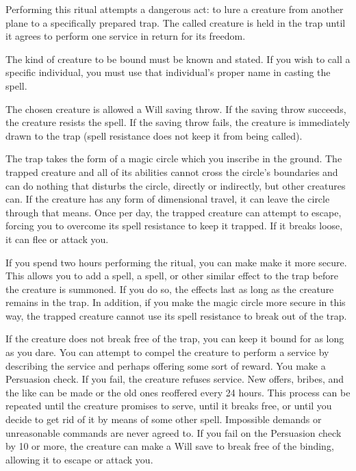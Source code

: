 \spelleffect Performing this ritual attempts a dangerous act: to lure a creature from another plane to a specifically prepared trap. The called creature is held in the trap until it agrees to perform one service in return for its freedom.
\par The kind of creature to be bound must be known and stated. If you wish to call a specific individual, you must use that individual's proper name in casting the spell.
\par The chosen creature is allowed a Will saving throw. If the saving throw succeeds, the creature resists the spell. If the saving throw fails, the creature is immediately drawn to the trap (spell resistance does not keep it from being called).
\par The trap takes the form of a magic circle which you inscribe in the ground. The trapped creature and all of its abilities cannot cross the circle's boundaries and can do nothing that disturbs the circle, directly or indirectly, but other creatures can. If the creature has any form of dimensional travel, it can leave the circle through that means. Once per day, the trapped creature can attempt to escape, forcing you to overcome its spell resistance to keep it trapped. If it breaks loose, it can flee or attack you.
\par If you spend two hours performing the ritual, you can make make it more secure. This allows you to add a  spell, a  spell, or other similar effect to the trap before the creature is summoned. If you do so, the effects last as long as the creature remains in the trap. In addition, if you make the magic circle more secure in this way, the trapped creature cannot use its spell resistance to break out of the trap.
\par If the creature does not break free of the trap, you can keep it bound for as long as you dare. You can attempt to compel the creature to perform a service by describing the service and perhaps offering some sort of reward. You make a Persuasion check. If you fail, the creature refuses service. New offers, bribes, and the like can be made or the old ones reoffered every 24 hours. This process can be repeated until the creature promises to serve, until it breaks free, or until you decide to get rid of it by means of some other spell. Impossible demands or unreasonable commands are never agreed to. If you fail on the Persuasion check by 10 or more, the creature can make a Will save to break free of the binding, allowing it to escape or attack you.
